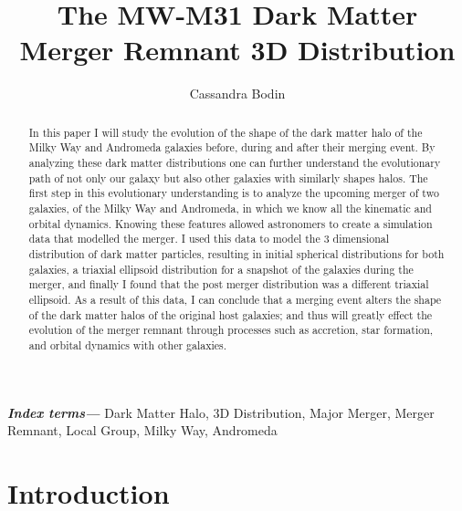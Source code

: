 \documentclass{aastex63}
\providecommand{\keywords}[1]{\textbf{\textit{Index terms---}} #1}
\begin{document}
\title{The MW-M31 Dark Matter Merger Remnant 3D Distribution\\}

\author{Cassandra Bodin}

\keywords{Dark Matter Halo, 3D Distribution, Major Merger, Merger Remnant, Local Group, Milky Way, Andromeda}


\begin{abstract}
In this paper I will study the evolution of the shape of the dark matter halo of the Milky Way and Andromeda galaxies before, during and after their merging event. By analyzing these dark matter distributions one can further understand the evolutionary path of not only our galaxy but also other galaxies with similarly shapes halos. The first step in this evolutionary understanding is to analyze the upcoming merger of two galaxies, of the Milky Way and Andromeda, in which we know all the kinematic and orbital dynamics. Knowing these features allowed astronomers to create a simulation data that modelled the merger. I used this data to model the 3 dimensional distribution of dark matter particles, resulting in initial spherical distributions for both galaxies, a triaxial ellipsoid distribution for a snapshot of the galaxies during the merger, and finally I found that the post merger distribution was a different triaxial ellipsoid. As a result of this data, I can conclude that a merging event alters the shape of the dark matter halos of the original host galaxies; and thus will greatly effect the evolution of the merger remnant through processes such as accretion, star formation, and orbital dynamics with other galaxies.
\end{abstract}



\section{Introduction} 

\end{document}
